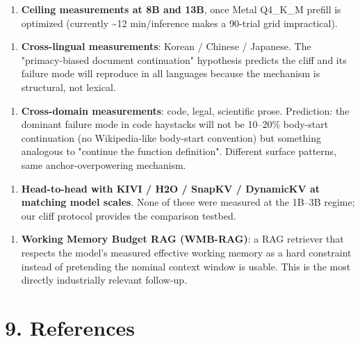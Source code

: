 \documentclass[11pt]{article}
\begin{document}
\begin{enumerate}
\item \textbf{Ceiling measurements at 8B and 13B}, once Metal Q4\_K\_M prefill is optimized (currently \textasciitilde{}12 min/inference makes a 90-trial grid impractical).
\end{enumerate}


\begin{enumerate}
\item \textbf{Cross-lingual measurements}: Korean / Chinese / Japanese. The "primacy-biased document continuation" hypothesis predicts the cliff and its failure mode will reproduce in all languages because the mechanism is structural, not lexical.
\end{enumerate}


\begin{enumerate}
\item \textbf{Cross-domain measurements}: code, legal, scientific prose. Prediction: the dominant failure mode in code haystacks will not be 10–20\% body-start continuation (no Wikipedia-like body-start convention) but something analogous to "continue the function definition". Different surface patterns, same anchor-overpowering mechanism.
\end{enumerate}


\begin{enumerate}
\item \textbf{Head-to-head with KIVI / H2O / SnapKV / DynamicKV at matching model scales}. None of these were measured at the 1B–3B regime; our cliff protocol provides the comparison testbed.
\end{enumerate}


\begin{enumerate}
\item \textbf{Working Memory Budget RAG (WMB-RAG)}: a RAG retriever that respects the model's measured effective working memory as a hard constraint instead of pretending the nominal context window is usable. This is the most directly industrially relevant follow-up.
\end{enumerate}


\section*{9. References}
\end{document}
